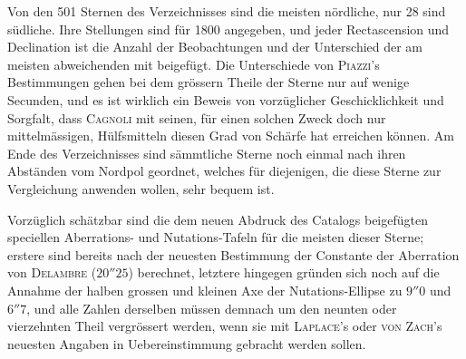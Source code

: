 Von den 501 Sternen des Verzeichnisses sind die meisten nördliche, nur 28 sind südliche. Ihre Stellungen sind für 1800 angegeben, und jeder Rectascension und Declination ist die Anzahl der Beobachtungen und der Unterschied der am meisten abweichenden mit beigefügt. Die Unterschiede von \textsc{Piazzi}'s Bestimmungen gehen bei dem grössern Theile der Sterne nur auf wenige Secunden, und es ist wirklich ein Beweis von vorzüglicher Geschicklichkeit und Sorgfalt, dass \textsc{Cagnoli} mit seinen, für einen solchen Zweck doch nur mittelmässigen, Hülfsmitteln diesen Grad von Schärfe hat erreichen können. Am Ende des Verzeichnisses sind sämmtliche Sterne noch einmal nach ihren Abständen vom Nordpol geordnet, welches für diejenigen, die diese Sterne zur Vergleichung anwenden wollen, sehr bequem ist.

Vorzüglich schätzbar sind die dem neuen Abdruck des Catalogs beigefügten speciellen Aberrations- und Nutations-Tafeln für die meisten dieser Sterne; erstere sind bereits nach der neuesten Bestimmung der Constante der Aberration von \textsc{Delambre} ($20''25$) berechnet, letztere hingegen gründen sich noch auf die Annahme der halben grossen und kleinen Axe der Nutations-Ellipse zu $9''0$ und $6''7$, und alle Zahlen derselben müssen demnach um den neunten oder vierzehnten Theil vergrössert werden, wenn sie mit \textsc{Laplace}'s oder \textsc{von Zach}'s neuesten Angaben in Uebereinstimmung gebracht werden sollen.
